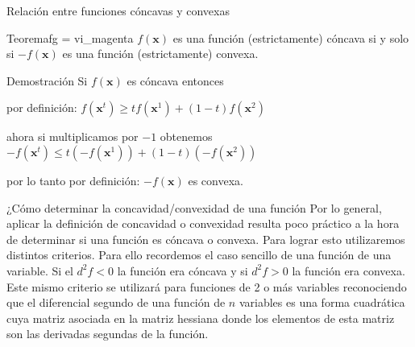 \documentclass[10pt,aspectratio=169]{beamer}  %
\begin{document}
\begin{frame}{Relación entre funciones cóncavas y convexas}
	\begin{varblock}{Teorema}{fg = vi_magenta}
	  $f(\mathbf{x})$ es una función (estrictamente) cóncava si y solo si $-f(\mathbf{x})$ es una función
	  (estrictamente) convexa. 
	\end{varblock}

	\begin{exampleblock}{Demostración}
		Si $f(\mathbf{x})$ es cóncava entonces
		
		por definición: $f(\mathbf{x}^t) \geq t f(\mathbf{x}^1) + (1 - t) f(\mathbf{x}^2)$

		ahora si multiplicamos por $-1$ obtenemos $-f(\mathbf{x}^t) \leq t (-f(\mathbf{x}^1)) + (1 - t) (-f(\mathbf{x}^2))$

		por lo tanto por definición: $-f(\mathbf{x})$ es convexa.

	\end{exampleblock}
\end{frame}

\begin{frame}{¿Cómo determinar la concavidad/convexidad de una función}
	Por lo general, aplicar la definición de concavidad o convexidad resulta poco práctico a la hora de determinar
	si una función es cóncava o convexa. Para lograr esto utilizaremos distintos criterios. Para ello recordemos el
	caso sencillo de una función de una variable. Si el $d^2f < 0$ la función era cóncava y si $d^2f > 0$ la función
	era convexa. Este mismo criterio se utilizará para funciones de 2 o más variables reconociendo que el diferencial
	segundo de una función de $n$ variables es una forma cuadrática cuya matriz asociada en la matriz hessiana donde
	los elementos de esta matriz son las derivadas segundas de la función.  
\end{frame}
\end{document}
